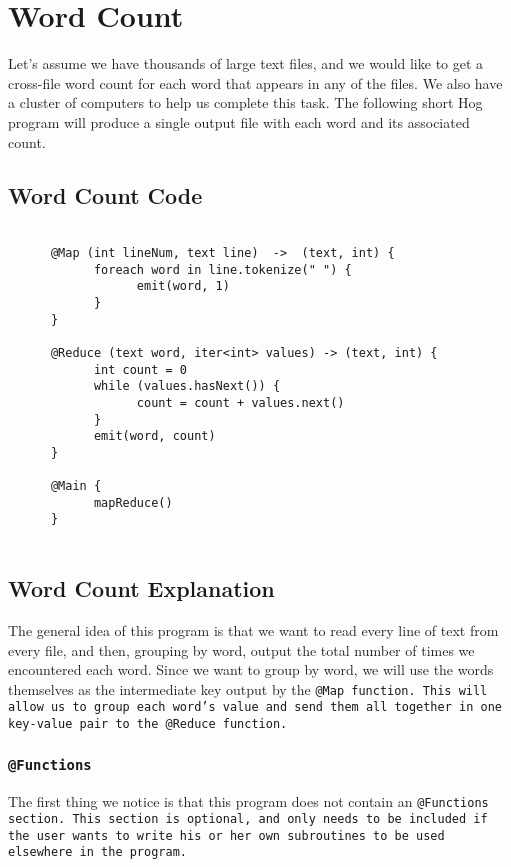 \documentclass{article} \usepackage{fancyhdr, multicol}
\begin{document}
\section*{Word Count} 
\label{word_count} 

Let's assume we have thousands of large text files, and we would like to get a
cross-file word count for each word that appears in any of the files. We also have
a cluster of computers to help us complete this task. The following short Hog
program will produce a single output file with each word and its associated count.

\subsection*{Word Count Code}
\begin{verbatim}
      
      @Map (int lineNum, text line)  ->  (text, int) {
            foreach word in line.tokenize(" ") {
                  emit(word, 1)
            }
      }
      
      @Reduce (text word, iter<int> values) -> (text, int) {
            int count = 0
            while (values.hasNext()) {
                  count = count + values.next()
            }
            emit(word, count)
      }
      
      @Main {
            mapReduce()
      }
      
\end{verbatim}

\subsection*{Word Count Explanation}

The general idea of this program is that we want to read every line of text from
every file, and then, grouping by word, output the total number of times we
encountered each word. Since we want to group by word, we will use the words
themselves as the intermediate key output by the \tt @Map \rm function. This will
allow us to group each word's value and send them all together in one key-value
pair to the \tt @Reduce \rm function.

\subsubsection*{\tt @Functions \rm}

The first thing we notice is that this program does not contain an \tt @Functions
\rm section. This section is optional, and only needs to be included if the user
wants to write his or her own subroutines to be used elsewhere in the program.
\end{document}
